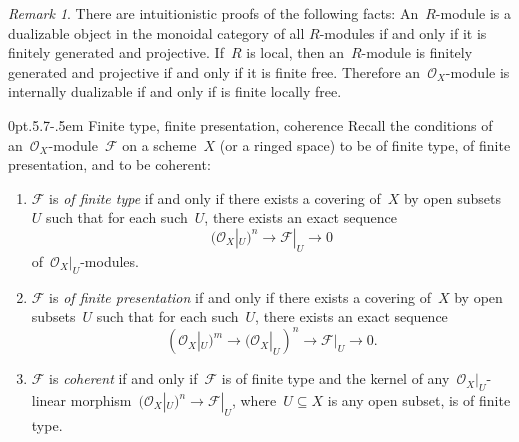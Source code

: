\documentclass[10pt,reqno,a4paper]{amsbook}
\makeatletter
\theoremstyle{definition}
\theoremstyle{plain}
\theoremstyle{remark}
\newtheorem{rem}[defn]{Remark}
\newcommand{\F}{\mathcal{F}}
\renewcommand{\O}{\mathcal{O}}
\newcommand{\?}{\,{:}\,}
\renewcommand{\_}{\mathpunct{.}\,}
\def\subsection{\@startsection{subsection}{2}%
  {0pt}{.5\linespacing\@plus.7\linespacing}{-.5em}%
  {\normalfont\bfseries}}
\makeatother
\begin{document}
\begin{rem}There are intuitionistic proofs of the following facts:
An~$R$-module is a dualizable object in the monoidal category of all
$R$-modules if and only if it is finitely generated and projective. If~$R$ is
local, then an~$R$-module is finitely generated and projective if and only if
it is finite free. Therefore an~$\O_X$-module is internally dualizable if and
only if is finite locally free.
\end{rem}


\subsection{Finite type, finite presentation, coherence}
Recall the conditions of an~$\O_X$-module~$\F$ on a scheme~$X$ (or a ringed
space) to be of finite type, of finite presentation, and to be coherent:
\begin{enumerate}
\item $\F$ is \emph{of finite type} if and only if there exists a covering of~$X$ by
open subsets~$U$ such that for each such~$U$, there exists an exact sequence
\[ (\O_X|_U)^n \longrightarrow \F|_U \longrightarrow 0 \]
of~$\O_X|_U$-modules.
\item $\F$ is \emph{of finite presentation} if and only if there exists a covering of~$X$ by
open subsets~$U$ such that for each such~$U$, there exists an exact sequence
\[ (\O_X|_U)^m \longrightarrow (\O_X|_U)^n \longrightarrow \F|_U \longrightarrow 0. \]
\item $\F$ is \emph{coherent} if and only if~$\F$ is of finite type and the
kernel of any~$\O_X|_U$-linear morphism~$(\O_X|_U)^n \to \F|_U$, where~$U \subseteq
X$ is any open subset, is of finite type.
\end{enumerate}
\end{document}
